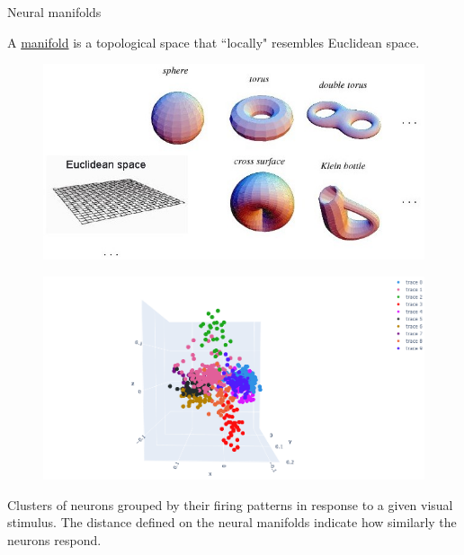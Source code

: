 \documentclass[xcolor={dvipsnames,svgnames}]{beamer}
\begin{document}
\begin{frame}{Neural manifolds}
    \begin{defn}[Manifold]
    A \underline{manifold} is a topological space that ``locally" resembles Euclidean space. 
    \end{defn}
    \begin{minipage}[t]{.45\linewidth}  
    \begin{figure}
     \includegraphics[width=\textwidth]{presentation/manifold.jpg}
    \end{figure} 
    \end{minipage}
    \hfill
      \begin{minipage}[t]{.45\linewidth}   
      \begin{figure}
      \includegraphics[width=\textwidth]{figures/embeddings/embedding-lab.png}
            \end{figure} 
    \end{minipage}
\begin{defn}
Clusters of neurons grouped by their firing patterns in response to a given visual stimulus. The distance defined on the neural manifolds indicate how similarly the neurons respond.
\end{defn}
\end{frame}
\end{document}
